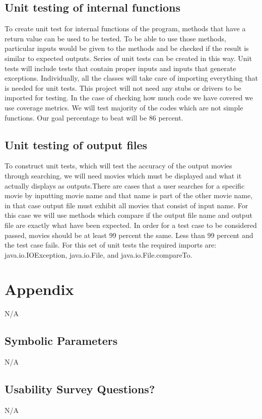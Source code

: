 \documentclass[12pt, titlepage]{article}
\begin{document}
\subsection{Unit testing of internal functions}
To create unit test for internal functions of the program, methods that have a return value can be used to be tested. To be able to use those methods, particular inputs would be given to the methods and be checked if the result is similar to expected outputs. Series of unit tests can be created in this way. Unit tests will include tests that contain proper inputs and inputs that generate exceptions. Individually, all the classes will take care of importing everything that is needed for unit tests. This project will not need any stubs or drivers to be imported for testing. In the case of checking how much code we have covered we use coverage metrics. We will test majority of the codes which are not simple functions. Our goal percentage to beat will be 86 percent.
		
\subsection{Unit testing of output files}		
To construct unit tests, which will test the accuracy of the output movies through searching, we will need movies which must be displayed and what it actually displays as outputs.There are cases that a user searches for a specific movie by inputting movie name and that name is part of the other movie name, in that case output file must exhibit all movies that consist of input name. For this case we will use methods which compare if the output file name and output file are exactly what have been expected. In order for a test case to be considered passed, movies should be at least 99 percent the same. Less than 99 percent and the test case fails. For this set of unit tests the required imports are:  java.io.IOException,  java.io.File, and java.io.File.compareTo.





\newpage

\section{Appendix}

N/A

\subsection{Symbolic Parameters}

N/A

\subsection{Usability Survey Questions?}

N/A
\end{document}
